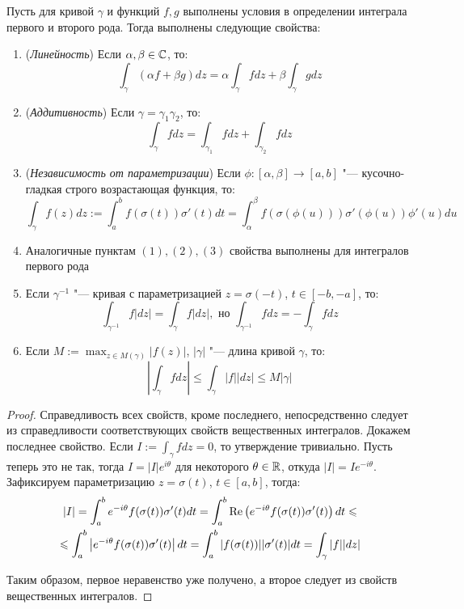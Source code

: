 \begin{theorem}
	Пусть для кривой $\gamma$ и функций $f, g$ выполнены условия в определении интеграла первого и второго рода. Тогда выполнены следующие свойства:
	\begin{enumerate}
		\item (\textit{Линейность}) Если $\alpha, \beta \in \mathbb{C}$, то:
		\[\int_{\gamma}(\alpha f+\beta g)dz = \alpha\int_\gamma fdz + \beta\int_\gamma gdz\]
		
		\item (\textit{Аддитивность}) Если $\gamma = \gamma_1\gamma_2$, то:
		\[\int_{\gamma}fdz = \int_{\gamma_1}fdz + \int_{\gamma_2}fdz\]
		
		\item (\textit{Независимость от параметризации}) Если $\phi : [\alpha, \beta] \to [a, b]$ "--- кусочно-гладкая строго возрастающая функция, то:
		\[\int_{\gamma}f(z)dz := \int_a^bf(\sigma(t))\sigma'(t)dt = \int_\alpha^\beta f(\sigma(\phi(u)))\sigma'(\phi(u))\phi'(u)du\]
		
		\item Аналогичные пунктам $(1), (2), (3)$ свойства выполнены для интегралов первого рода
		
		\item Если $\gamma^{-1}$ "--- кривая с параметризацией $z = \sigma(-t)$, $t \in [-b, -a]$, то:
		\[\int_{\gamma^{-1}}f|dz| = \int_\gamma f|dz|,\text{ но }\int_{\gamma^{-1}}fdz = -\int_\gamma fdz\]
		
		\item Если $M := \max_{z \in M(\gamma)}|f(z)|$, $|\gamma|$ "--- длина кривой $\gamma$, то:
		\[\left|\int_\gamma fdz\right| \le \int_\gamma|f||dz| \le M|\gamma|\]
	\end{enumerate}
\end{theorem}

\begin{proof}
	Справедливость всех свойств, кроме последнего, непосредственно следует из справедливости соответствующих свойств вещественных интегралов. Докажем последнее свойство. Если $I := \int_\gamma fdz = 0$, то утверждение тривиально. Пусть теперь это не так, тогда $I = |I|e^{i\theta}$ для некоторого $\theta \in \mathbb{R}$, откуда $|I| = Ie^{-i\theta}$. Зафиксируем параметризацию $z = \sigma(t)$, $t \in [a, b]$, тогда:
	\begin{multline*}
		|I| = \int_{a}^be^{-i\theta} f(\sigma(t))\sigma'(t)dt = \int_{a}^b\operatorname{Re}\left(e^{-i\theta} f(\sigma(t))\sigma'(t)\right)dt \leqslant \\
		\leqslant \int_{a}^b\left|e^{-i\theta} f(\sigma(t))\sigma'(t)\right|dt = \int_{a}^b|f(\sigma(t))||\sigma'(t)|dt = \int_\gamma |f||dz|
	\end{multline*}

	Таким образом, первое неравенство уже получено, а второе следует из свойств вещественных интегралов.
\end{proof}

